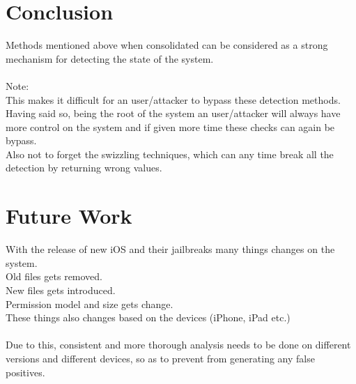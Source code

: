 \newpage
\section{Conclusion}
\vspace{20px}
Methods mentioned above when consolidated can be considered as a strong mechanism for detecting the state of the system.\\\\
Note:\\ 
This makes it difficult for an user/attacker to bypass these detection methods.\\
Having said so, being the root of the system an user/attacker will always have more control on the system and if given more time these checks can again be bypass.\\
Also not to forget the swizzling techniques, which can any time break all the detection by returning wrong values.


\newpage
\section{Future Work}
\vspace{20px}
With the release of new iOS and their jailbreaks many things changes on the system.\\
Old files gets removed.\\
New files gets introduced.\\ 
Permission model and size gets change.\\
These things also changes based on the devices (iPhone, iPad etc.)\\\\
Due to this, consistent and more thorough analysis needs to be done on different versions and different devices, so as to prevent from generating any false positives.

